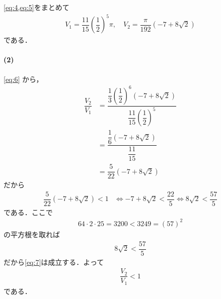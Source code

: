 \documentclass[../../main.tex]{subfiles}
\begin{document}
\cref{eq:4,eq:5}をまとめて
\begin{align}
  V_1 = \dfrac{11}{15} \left(\dfrac{1}{2}\right)^5 \pi, \quad
  V_2 = \dfrac{\pi}{192} (-7 + 8\sqrt{2}) \label{eq:6}
\end{align}
である．

\paragraph{(2)}

\cref{eq:6} から，
\begin{align}
  \dfrac{V_2}{V_1}
  &= \dfrac{\dfrac{1}{3} \left(\dfrac{1}{2}\right)^6 (-7 + 8\sqrt{2})}{\dfrac{11}{15} \left(\dfrac{1}{2}\right)^5} \\
  &= \dfrac{\dfrac{1}{6}(-7 + 8\sqrt{2})}{\dfrac{11}{15}} \\
  &= \dfrac{5}{22} (-7 + 8\sqrt{2})
\end{align}
だから
\begin{align}
  \dfrac{5}{22} (-7 + 8\sqrt{2}) < 1
  &\iff
  -7 + 8\sqrt{2} < \dfrac{22}{5}
  \iff
  8\sqrt{2} < \dfrac{57}{5} \label{eq:7}
\end{align}
である．ここで
\begin{align}
  64 \cdot 2 \cdot 25 = 3200 < 3249 = (57)^2
\end{align}
の平方根を取れば
\begin{align}
  8\sqrt{2} < \dfrac{57}{5}
\end{align}
だから\cref{eq:7}は成立する．よって
\begin{align}
  \dfrac{V_2}{V_1} < 1
\end{align}
である．
\end{document}
